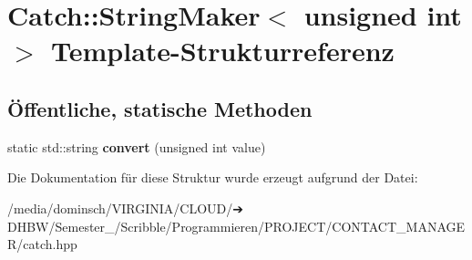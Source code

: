 \hypertarget{structCatch_1_1StringMaker_3_01unsigned_01int_01_4}{}\section{Catch\+:\+:String\+Maker$<$ unsigned int $>$ Template-\/\+Strukturreferenz}
\label{structCatch_1_1StringMaker_3_01unsigned_01int_01_4}
\subsection*{Öffentliche, statische Methoden}
\begin{DoxyCompactItemize}
\item 
\mbox{\label{structCatch_1_1StringMaker_3_01unsigned_01int_01_4_aa0ec816ef8a65664b0524d55d08e2fd9}} 
static std\+::string {\bfseries convert} (unsigned int value)
\end{DoxyCompactItemize}


Die Dokumentation für diese Struktur wurde erzeugt aufgrund der Datei\+:\begin{DoxyCompactItemize}
\item 
/media/dominsch/\+V\+I\+R\+G\+I\+N\+I\+A/\+C\+L\+O\+U\+D/➔ D\+H\+B\+W/\+Semester\+\_/\+Scribble/\+Programmieren/\+P\+R\+O\+J\+E\+C\+T/\+C\+O\+N\+T\+A\+C\+T\+\_\+\+M\+A\+N\+A\+G\+E\+R/catch.\+hpp\end{DoxyCompactItemize}
